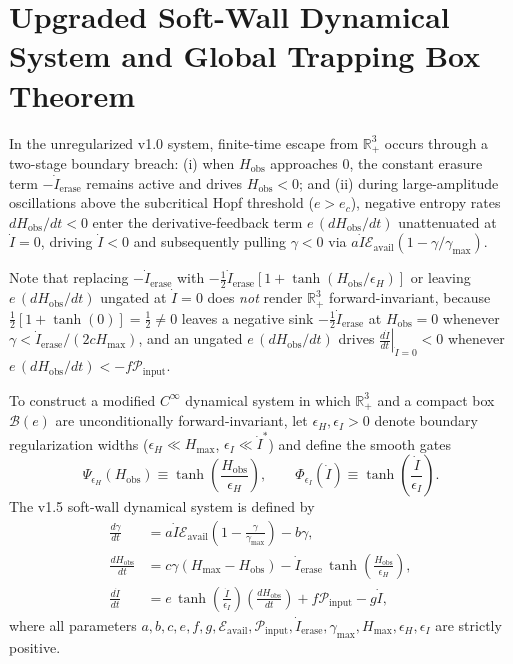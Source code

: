 \documentclass[11pt,a4paper]{article}
\theoremstyle{remark}
\begin{document}
\section{Upgraded Soft-Wall Dynamical System and Global Trapping Box Theorem}

In the unregularized v1.0 system, finite-time escape from $\mathbb{R}^3_+$ occurs through a two-stage boundary breach: (i) when $H_{\text{obs}}$ approaches $0$, the constant erasure term $-\dot{I}_{\text{erase}}$ remains active and drives $H_{\text{obs}} < 0$; and (ii) during large-amplitude oscillations above the subcritical Hopf threshold ($e > e_c$), negative entropy rates $dH_{\text{obs}}/dt < 0$ enter the derivative-feedback term $e\,(dH_{\text{obs}}/dt)$ unattenuated at $\dot{I} = 0$, driving $\dot{I} < 0$ and subsequently pulling $\gamma < 0$ via $a\dot{I}\mathcal{E}_{\text{avail}}(1-\gamma/\gamma_{\max})$.

Note that replacing $-\dot{I}_{\text{erase}}$ with $-\frac{1}{2}\dot{I}_{\text{erase}}[1+\tanh(H_{\text{obs}}/\epsilon_H)]$ or leaving $e\,(dH_{\text{obs}}/dt)$ ungated at $\dot{I}=0$ does \emph{not} render $\mathbb{R}^3_+$ forward-invariant, because $\frac{1}{2}[1+\tanh(0)] = \frac{1}{2} \neq 0$ leaves a negative sink $-\frac{1}{2}\dot{I}_{\text{erase}}$ at $H_{\text{obs}}=0$ whenever $\gamma < \dot{I}_{\text{erase}}/(2cH_{\max})$, and an ungated $e\,(dH_{\text{obs}}/dt)$ drives $\left.\frac{d\dot{I}}{dt}\right|_{\dot{I}=0} < 0$ whenever $e\,(dH_{\text{obs}}/dt) < -f\mathcal{P}_{\text{input}}$.

To construct a modified $C^\infty$ dynamical system in which $\mathbb{R}^3_+$ and a compact box $\mathcal{B}(e)$ are unconditionally forward-invariant, let $\epsilon_H, \epsilon_I > 0$ denote boundary regularization widths ($\epsilon_H \ll H_{\max}$, $\epsilon_I \ll \dot{I}^*$) and define the smooth gates
\begin{equation}
\label{eq:gates}
\Psi_{\epsilon_H}(H_{\text{obs}}) \equiv \tanh\!\left(\frac{H_{\text{obs}}}{\epsilon_H}\right), \qquad \Phi_{\epsilon_I}(\dot{I}) \equiv \tanh\!\left(\frac{\dot{I}}{\epsilon_I}\right).
\end{equation}
The v1.5 soft-wall dynamical system is defined by
\begin{align}
\frac{d\gamma}{dt} &= a \dot{I} \mathcal{E}_{\text{avail}}\!\left(1 - \frac{\gamma}{\gamma_{\max}}\right) - b\gamma, \label{eq:v15_gamma} \\
\frac{dH_{\text{obs}}}{dt} &= c\gamma (H_{\max} - H_{\text{obs}}) - \dot{I}_{\text{erase}}\,\tanh\!\left(\frac{H_{\text{obs}}}{\epsilon_H}\right), \label{eq:v15_H} \\
\frac{d\dot{I}}{dt} &= e\,\tanh\!\left(\frac{\dot{I}}{\epsilon_I}\right)\!\left(\frac{dH_{\text{obs}}}{dt}\right) + f\mathcal{P}_{\text{input}} - g\dot{I}, \label{eq:v15_I}
\end{align}
where all parameters $a, b, c, e, f, g, \mathcal{E}_{\text{avail}}, \mathcal{P}_{\text{input}}, \dot{I}_{\text{erase}}, \gamma_{\max}, H_{\max}, \epsilon_H, \epsilon_I$ are strictly positive.
\end{document}
